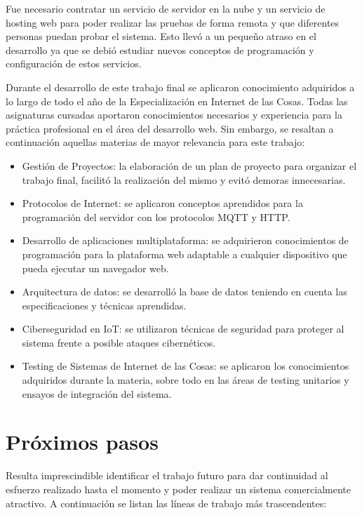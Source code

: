 Fue necesario contratar un servicio de servidor en la nube y un servicio de hosting web para poder realizar las pruebas de forma remota y que diferentes personas puedan probar el sistema. Esto llevó a un pequeño atraso en el desarrollo ya que se debió estudiar nuevos conceptos de programación y configuración de estos servicios. 

Durante el desarrollo de este trabajo final se aplicaron conocimiento adquiridos a lo largo de todo el año de la Especialización en Internet de las Cosas. Todas las asignaturas cursadas aportaron conocimientos necesarios y experiencia para la práctica profesional en el área del desarrollo web.  Sin embargo, se resaltan a continuación aquellas materias de mayor relevancia para este trabajo:

\begin{itemize}
	\item Gestión de Proyectos: la elaboración de un plan de proyecto para organizar el trabajo final, facilitó la realización del mismo y evitó demoras innecesarias. 
	\item Protocolos de Internet: se aplicaron conceptos aprendidos para la programación del servidor con los protocolos MQTT y HTTP.
	\item Desarrollo de aplicaciones multiplataforma: se adquirieron conocimientos de programación para la plataforma web adaptable a cualquier dispositivo que pueda ejecutar un navegador web.
	\item Arquitectura de datos: se desarrolló la base de datos teniendo en cuenta las especificaciones y técnicas aprendidas. 
	\item Ciberseguridad en IoT: se utilizaron técnicas de seguridad para proteger al sistema frente a posible ataques cibernéticos. 
	\item Testing de Sistemas de Internet de las Cosas: se aplicaron los conocimientos adquiridos durante la materia, sobre todo en las áreas de testing unitarios y ensayos de integración del sistema.
\end{itemize}


\section{Próximos pasos}

Resulta imprescindible identificar el trabajo futuro para dar continuidad al esfuerzo realizado hasta el momento y poder realizar un sistema comercialmente atractivo. A continuación se listan las líneas de trabajo más trascendentes:

